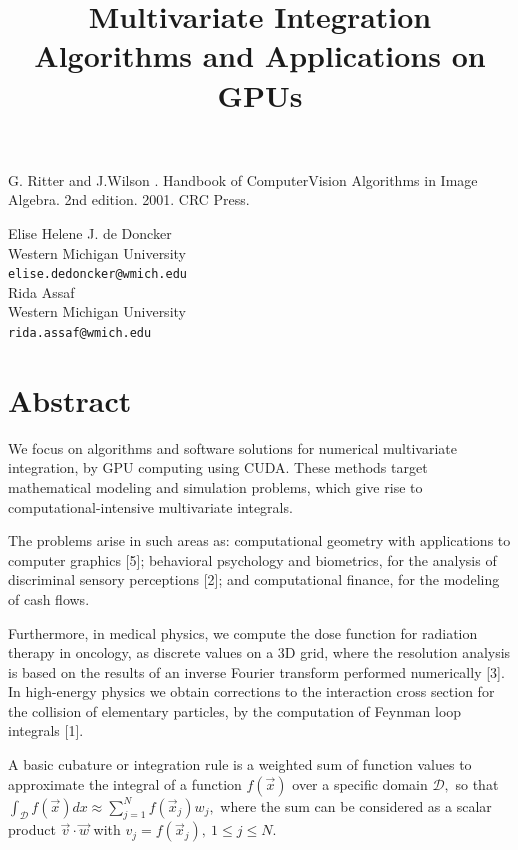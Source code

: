 \documentclass[article,A4,11pt]{llncs}%
\begin{document}

\begin{thebibliography}{10}
{\sc G. Ritter and J.Wilson }. {Handbook of ComputerVision Algorithms in Image Algebra}. 2nd edition. 2001. CRC Press.
\end{thebibliography}

\title{Multivariate Integration Algorithms and Applications on GPUs}
 \author{} \institute{}
\maketitle
\begin{center}
{\large Elise Helene J. de Doncker}\\
Western Michigan University\\
{\tt elise.dedoncker@wmich.edu}
\\ \vspace{4mm}
{\large Rida Assaf}\\
Western Michigan University\\
{\tt rida.assaf@wmich.edu}
\end{center}

\section*{Abstract}
We focus on algorithms and software solutions for numerical multivariate integration, by GPU computing using CUDA. These methods target mathematical modeling and simulation problems, which give rise to computational-intensive multivariate integrals.

The problems arise in such areas as: computational geometry with applications to computer graphics [5]; behavioral psychology and biometrics, for the analysis of discriminal sensory perceptions [2]; and computational finance, for the modeling of cash flows. 

Furthermore, in medical physics, we compute the dose function for radiation therapy in oncology, as discrete values on a 3D grid, where the resolution analysis is based on the results of an inverse Fourier transform performed numerically [3]. In high-energy physics we obtain corrections to the interaction cross section for the collision of elementary particles, by the computation of Feynman loop integrals [1]. 

A basic cubature or integration rule is a weighted sum of function values to approximate the integral of a function $f(\vec{x})$ over a specific domain ${\mathcal D},$ so that
$\int_{\mathcal D} f(\vec{x}) dx \approx \sum_{j=1}^N f(\vec{x}_j) w_j,$ where the sum can be considered as a scalar product $\vec{v}\cdot \vec{w}$ with $v_j =  f(\vec{x}_j), ~1\le j\le N.$ 
\end{document}
